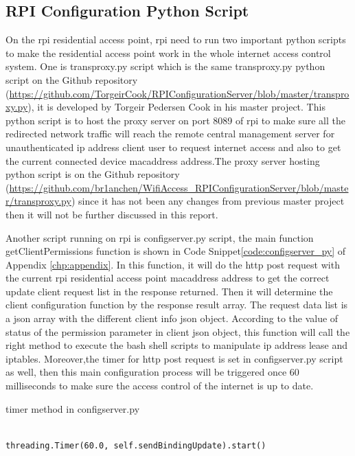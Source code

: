 \subsection{RPI Configuration Python Script}
\par On the \gls{rpi} residential access point, \gls{rpi} need to run two important python scripts to make the residential access point work in the whole internet access control system. One is transproxy.py script which is the same transproxy.py python script on the Github repository (\url{https://github.com/TorgeirCook/RPIConfigurationServer/blob/master/transproxy.py}), it is developed by Torgeir Pedersen Cook in his master project. This python script is to host the proxy server on port 8089 of \gls{rpi} to make sure all the redirected network traffic will reach the remote central management server for unauthenticated \gls{ip} address client user to request internet access and also to get the current connected device \gls{macaddress} address.The proxy server hosting python script is on the Github repository (\url{https://github.com/br1anchen/WifiAccess_RPIConfigurationServer/blob/master/transproxy.py}) since it has not been any changes from previous master project then it will not be further discussed in this report.
\par Another script running on \gls{rpi} is configserver.py script, the main function getClientPermissions function is shown in Code Snippet\ref{code:configserver_py} of Appendix \ref{chp:appendix}. In this function, it will do the \gls{http} post request with the current \gls{rpi} residential access point \gls{macaddress} address to get the correct update client request list in the response returned. Then it will determine the client configuration function by the response result array. The request data list is a \gls{json} array with the different client info \gls{json} object. According to the value of status of the permission parameter in client \gls{json} object, this function will call the right method to execute the bash shell scripts to manipulate \gls{ip} address lease and iptables. Moreover,the timer for \gls{http} post request is set in configserver.py script as well, then this main configuration process will be triggered once 60 milliseconds to make sure the access control of the internet is up to date.
\begin{algorithm}[h]
  \caption{timer method in configserver.py}
  \label{code:timer_configserver}
  \begin{verbatim}
  
threading.Timer(60.0, self.sendBindingUpdate).start()
 \end{verbatim}
\end{algorithm}

